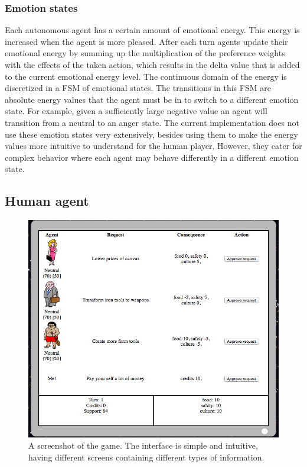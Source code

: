 \documentclass[11pt,a4paper]{article}
\begin{document}
    \subsubsection{Emotion states}
      Each autonomous agent has a certain amount of emotional energy. This energy is increased when the agent is more pleased. After each turn agents update their emotional energy by summing up the multiplication of the preference weights with the effects of the taken action, which results in the delta value that is added to the current emotional energy level. The continuous domain of the energy is discretized in a FSM of emotional states. The transitions in this FSM are absolute energy values that the agent must be in to switch to a different emotion state. For example, given a sufficiently large negative value an agent will transition from a neutral to an anger state. The current implementation does not use these emotion states very extensively, besides using them to make the energy values more intuitive to understand for the human player. However, they cater for complex behavior where each agent may behave differently in a different emotion state.
  \subsection{Human agent}
        \begin{figure}[t]
      \centering
      \includegraphics[scale=0.5]{screenshot}
      \caption{A screenshot of the game. The interface is simple and intuitive, having different screens containing different types of information. }
      \label{fig:scr}
      \end{figure}
      
\end{document}
